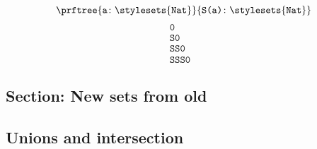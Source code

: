 {\begin{forslides}
\begin{equation}
        \end{equation}
        \begin{equation}
            \label{eq:typecon_8_session1_22}
            \prftree{\texttt{a}\colon \stylesets{\texttt{Nat}}}
            {\texttt{S(a)}\colon \stylesets{\texttt{Nat}}}
        \end{equation}
        \begin{equation}
            \label{eq:typecon_9_session1_22}
            \begin{aligned}
                \texttt{0}    & \\
                \texttt{S0}   & \\
                \texttt{SS0}  & \\
                \texttt{SSS0} &
            \end{aligned}
        \end{equation}

        \subsection{Section: New sets from old}

        \subsection{Unions and intersection}


\end{forslides}}
